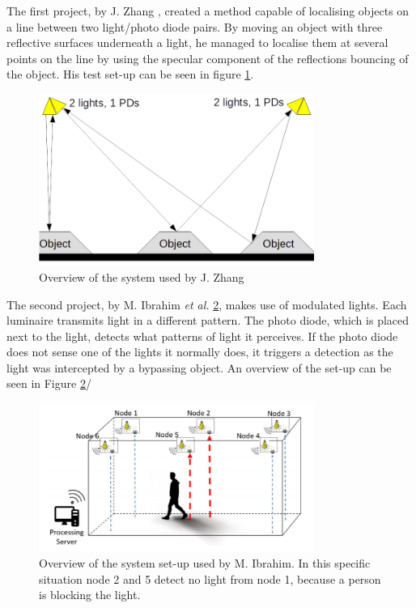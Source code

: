 The first project, by J. Zhang \cite{JakesWork}, created a method capable of localising objects on a line between two light/photo diode pairs. By moving an object with three reflective surfaces underneath a light, he managed to localise them at several points on the line by using the specular component of the reflections bouncing of the object. His test set-up can be seen in figure \ref{Zhangpicca}.
\begin{figure}[]
	\centering
	\includegraphics[width=90mm]{pics/Pic_Jake.png}
	\caption{Overview of the system used by J. Zhang \cite{JakesWork}\label{Zhangpicca}}
\end{figure}

The second project, by M. Ibrahim \textit{et al.} \ref{fig:Ceiling_PD}, makes use of modulated lights. Each luminaire transmits light in a different pattern. The photo diode, which is placed next to the light, detects what patterns of light it perceives. If the photo diode does not sense one of the lights it normally does, it triggers a detection as the light was intercepted by a bypassing object. An overview of the set-up can be seen in Figure \ref{fig:Ceiling_PD}/

\begin{figure}[]
	\centering
	\includegraphics[width=90mm]{pics/lightspdceiling.png}
	\caption{Overview of the system set-up used by M. Ibrahim\cite{Ceiling_PD}. In this specific situation node 2 and 5 detect no light from node 1, because a person is blocking the light.\label{fig:Ceiling_PD}}
\end{figure}

